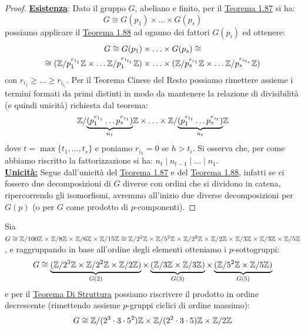 \documentclass[11pt]{scrartcl}
\begin{document}
\begin{proof}
    \underline{\textbf{Esistenza}}: Dato il gruppo $G$, abeliano e finito, per il \hyperref[t:t1]{Teorema 1.87} si ha:
        \[ G \cong G(p_1) \times \ldots \times G(p_s)
            \]
    possiamo applicare il \hyperref[t:t2]{Teorema 1.88} ad ognuno dei fattori $G(p_i)$ ed ottenere:
        \begin{multline*}
            G \cong G(p_1) \times \ldots \times G(p_s) \cong \\
            \cong (\mathbb{Z}/{p_1^{r_{1_1}}}\mathbb{Z} \times \ldots \mathbb{Z}/{p_1^{r_{1_{t_1}}}}\mathbb{Z}) \times \ldots \times (\mathbb{Z}/{p_s^{r_{s_1}}}\mathbb{Z} \times \ldots \mathbb{Z}/{p_s^{r_{s_{t_s}}}}\mathbb{Z})
        \end{multline*}
    con $r_{i_1} \geq \ldots \geq r_{i_{t_i}}$. Per il Teorema Cinese del Resto possiamo rimettere assieme i termini formati da primi distinti in modo da mantenere la relazione di divisibilità (e quindi unicità)
    richiesta dal teorema:
    \[ \mathbb{Z}/{\underbrace{(p_1^{r_{1_1}}\ldots p_s^{r_{s_1}})}_{n_1}}\mathbb{Z} \times \ldots \times \mathbb{Z}/{\underbrace{(p_1^{r_{1_t}}\ldots p_s^{r_{s_t}})}_{n_t}}\mathbb{Z}
        \]
    dove $t = \max\{t_1,\ldots,t_s\}$ e poniamo $r_{i_h} = 0$ se $h>t_i$. Si osserva che, per come abbiamo riscritto la fattorizzazione si ha: $n_t \mid n_{t-1} \mid \ldots \mid n_1$.\\
    \underline{\textbf{Unicità:}} Segue dall'unicità del \hyperref[t:t1]{Teorema 1.87} e del \hyperref[t:t2]{Teorema 1.88}, infatti se ci fossero due decomposizioni di 
    $G$ diverse con ordini che si dividono in catena, ripercorrendo gli isomorfismi, avremmo all'inizio due diverse decomposizioni per $G(p)$ (o per $G$ come prodotto di $p$-componenti).
\end{proof}

\begin{example}
    Sia $G \cong \mathbb{Z}/{100}\mathbb{Z} \times \mathbb{Z}/{8}\mathbb{Z} \times \mathbb{Z}/{6}\mathbb{Z} \times \mathbb{Z}/{15}\mathbb{Z} \cong \mathbb{Z}/{2^2}\mathbb{Z} \times \mathbb{Z}/{5^2}\mathbb{Z} \times \mathbb{Z}/{2^3}\mathbb{Z} \times \mathbb{Z}/{2}\mathbb{Z} \times \mathbb{Z}/{3}\mathbb{Z} \times \mathbb{Z}/{3}\mathbb{Z} \times \mathbb{Z}/{5}\mathbb{Z}$, e raggruppando in base all'ordine degli elementi
    otteniamo i $p$-sottogruppi:
        \[ G \cong \underbrace{(\mathbb{Z}/{2^3}\mathbb{Z} \times \mathbb{Z}/{2^2}\mathbb{Z} \times \mathbb{Z}/{2}\mathbb{Z})}_{G(2)} \times \underbrace{(\mathbb{Z}/{3}\mathbb{Z} \times \mathbb{Z}/{3}\mathbb{Z})}_{G(3)} \times \underbrace{(\mathbb{Z}/{5^2}\mathbb{Z} \times \mathbb{Z}/{5}\mathbb{Z})}_{G(5)}
            \]
    e per il \hyperref[t:struttura]{Teorema Di Struttura} possiamo riscrivere il prodotto in ordine decrescente (rimettendo assieme $p$-gruppi ciclici di ordine massimo):
        \[ G \cong \mathbb{Z}/{(2^3\cdot 3 \cdot 5^2)}\mathbb{Z} \times \mathbb{Z}/{(2^2 \cdot 3 \cdot 5)}\mathbb{Z} \times \mathbb{Z}/{2}\mathbb{Z}
            \]
\end{example}
\end{document}
